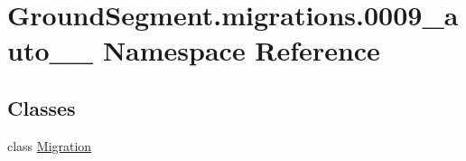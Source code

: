 \hypertarget{namespace_ground_segment_1_1migrations_1_10009__auto__20161126__1856}{}\section{Ground\+Segment.\+migrations.0009\+\_\+auto\+\_\+\_ Namespace Reference}
\label{namespace_ground_segment_1_1migrations_1_10009__auto__20161126__1856}
\subsection*{Classes}
\begin{DoxyCompactItemize}
\item 
class \hyperlink{class_ground_segment_1_1migrations_1_10009__auto__20161126__1856_1_1_migration}{Migration}
\end{DoxyCompactItemize}
